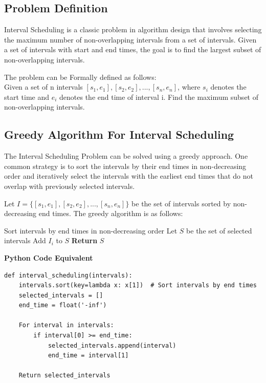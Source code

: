 \documentclass[12pt]{book} %
\begin{document}
\subsection{Problem Definition}
Interval Scheduling is a classic problem in algorithm design that involves selecting the maximum number of non-overlapping intervals from a set of intervals. Given a set of intervals with start and end times, the goal is to find the largest subset of non-overlapping intervals.

The problem can be Formally defined as follows: \\
Given a set of n intervals $[s_1, e_1], [s_2, e_2], ..., [s_n, e_n]$, where $s_i$ denotes the start time and $e_i$ denotes the end time of interval i. Find the maximum subset of non-overlapping intervals.

\subsection{Greedy Algorithm For Interval Scheduling}
The Interval Scheduling Problem can be solved using a greedy approach. One common strategy is to sort the intervals by their end times in non-decreasing order and iteratively select the intervals with the earliest end times that do not overlap with previously selected intervals.

Let $I = \{[s_1, e_1], [s_2, e_2], ..., [s_n, e_n]\}$ be the set of intervals sorted by non-decreasing end times. The greedy algorithm is as follows:
\FloatBarrier
\begin{algorithm}
\caption{Interval Scheduling Algorithm}
\begin{algorithmic}[1]
\State Sort intervals by end times in non-decreasing order
\State Let $S$ be the set of selected intervals
\State Add $I_i$ to $S$
\EndIf
\EndFor
\State \textbf{Return} $S$
\end{algorithmic}
\end{algorithm}
\FloatBarrier
\textbf{Python Code Equivalent}
\begin{lstlisting}
def interval_scheduling(intervals):
    intervals.sort(key=lambda x: x[1])  # Sort intervals by end times
    selected_intervals = []
    end_time = float('-inf')
    
    For interval in intervals:
        if interval[0] >= end_time:
            selected_intervals.append(interval)
            end_time = interval[1]
    
    Return selected_intervals
\end{lstlisting}
\end{document}

